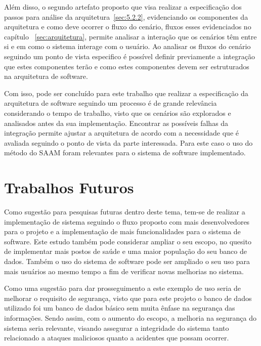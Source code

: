 Além disso, o segundo artefato proposto que visa realizar a especificação dos passos para análise da arquitetura~\ref{sec:5.2.2}, evidenciando os componentes da arquitetura e como deve ocorrer o fluxo do cenário, fluxos esses evidenciados no capítulo ~\ref{sec:arquitetura}, permite analisar a interação que os cenários têm entre si e em como o sistema interage com o usuário. Ao analisar os fluxos do cenário seguindo um ponto de vista  especifico é possível definir previamente a integração que estes componentes terão e como estes componentes devem ser estruturados na arquitetura de software.

Com isso, pode ser concluído para este trabalho que realizar a especificação da arquitetura de software seguindo um processo é de grande relevância considerando o tempo de trabalho, visto que os cenários são explorados e analisados antes da sua implementação. Encontrar as possíveis falhas da integração permite ajustar a arquitetura de acordo com a necessidade que é avaliada seguindo o ponto de vista da parte interessada.
Para este caso o uso do método do \acrfull{SAAM} foram relevantes para o sistema de software implementado.

\section{Trabalhos Futuros}

Como sugestão para pesquisas futuras dentro deste tema, tem-se de realizar a implementação de sistema seguindo o fluxo proposto com mais desenvolvedores para o projeto e a implementação de mais funcionalidades para o sistema de software. Este estudo também pode considerar ampliar o seu escopo, no quesito de implementar mais postos de saúde e  uma maior população do seu banco de dados. Também o uso do sistema de software pode  ser ampliado o seu uso para mais usuários ao mesmo tempo a fim de verificar novas melhorias no sistema.

Como uma sugestão para dar prosseguimento a este exemplo de uso seria de melhorar o requisito de segurança, visto que para este projeto o banco de dados utilizado foi um banco de dados básico sem muita ênfase na segurança das informações. Sendo assim, com o aumento do escopo, a melhoria na segurança do sistema seria relevante, visando assegurar a integridade do sistema tanto relacionado a ataques maliciosos quanto a acidentes que possam ocorrer.
